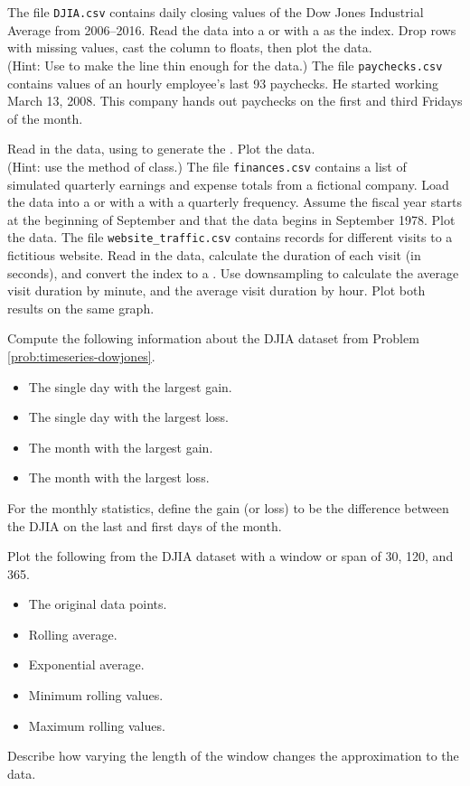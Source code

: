 The file \texttt{DJIA.csv} contains daily closing values of the Dow Jones Industrial Average from 2006--2016.
Read the data into a  or  with a  as the index.
Drop rows with missing values, cast the  column to floats, then plot the data.
\\(Hint: Use  to make the line thin enough for the data.)
\label{prob:timeseries-dowjones}
The file \texttt{paychecks.csv} contains values of an hourly employee's last 93 paychecks.
He started working March 13, 2008.
This company hands out paychecks on the first and third Fridays of the month.

Read in the data, using  to generate the .
Plot the data.
\\(Hint: use the  method of  class.)
The file \texttt{finances.csv} contains a list of simulated quarterly earnings and expense totals from a fictional company.
Load the data into a  or  with a  with a quarterly frequency.
Assume the fiscal year starts at the beginning of September and that the data begins in September 1978.
Plot the data.
The file \texttt{website\_traffic.csv} contains records for different visits to a fictitious website.
Read in the data, calculate the duration of each visit (in seconds), and convert the index to a .
Use downsampling to calculate the average visit duration by minute, and the average visit duration by hour.
Plot both results on the same graph.

Compute the following information about the DJIA dataset from Problem \ref{prob:timeseries-dowjones}.
\begin{itemize}
    \item The single day with the largest gain.
    \item The single day with the largest loss.
    \item The month with the largest gain.
    \item The month with the largest loss.
\end{itemize}
For the monthly statistics, define the gain (or loss) to be the difference between the DJIA on the last and first days of the month.

Plot the following from the DJIA dataset with a window or span of 30, 120, and 365.
\begin{itemize}
    \item The original data points.
    \item Rolling average.
    \item Exponential average.
    \item Minimum rolling values.
    \item Maximum rolling values.
\end{itemize}
Describe how varying the length of the window changes the approximation to the data.
